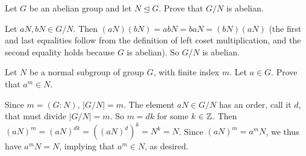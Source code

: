 \begin{exercise}
Let $G$ be an abelian group and let $N\unlhd G$. Prove that $G/N$ is abelian.
\end{exercise}

\begin{solution}[print=false]
Let $aN, bN\in G/N$.  Then $(aN)(bN)=abN=baN=(bN)(aN)$ (the first and last equalities follow from the definition of left coset multiplication, and the second equality holds because $G$ is abelian).  So $G/N$ is abelian.
\end{solution}

\begin{exercise} Let $N$ be a normal subgroup of group $G$, with finite index $m$.  Let $a\in G$. Prove that $a^m\in N$.
\end{exercise}

\begin{solution}[print=false]
Since $m=(G:N)$, $|G/N|=m$.  The element
$aN\in G/N$ has an order, call it $d$, that must divide $|G/N|=m$.
So $m=dk$ for some $k\in \mathbb{Z}$.  Then
$(aN)^m=(aN)^{dk}=((aN)^d)^k=N^k=N$. Since $(aN)^m=a^mN$, we thus
have $a^mN=N$, implying that $a^m\in N$, as desired.\end{solution} 